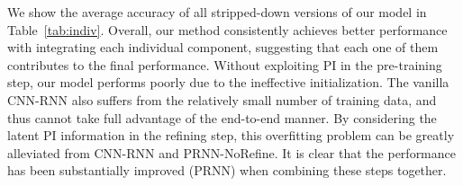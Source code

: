 \documentclass[10pt,twocolumn,letterpaper]{article}
\begin{document}


We show the average accuracy of all stripped-down versions of our model in Table~\ref{tab:indiv}. Overall, our method consistently achieves better performance with integrating each individual component, suggesting that each one of them contributes to the final performance. Without exploiting PI in the pre-training step, our model performs poorly due to the ineffective initialization. The vanilla CNN-RNN also suffers from the relatively small number of training data, and thus cannot take full advantage of the end-to-end manner. By considering the latent PI information in the refining step, this overfitting problem can be greatly alleviated from CNN-RNN and PRNN-NoRefine. It is clear that the performance has been substantially improved (PRNN) when combining these steps together. 


\end{document}
